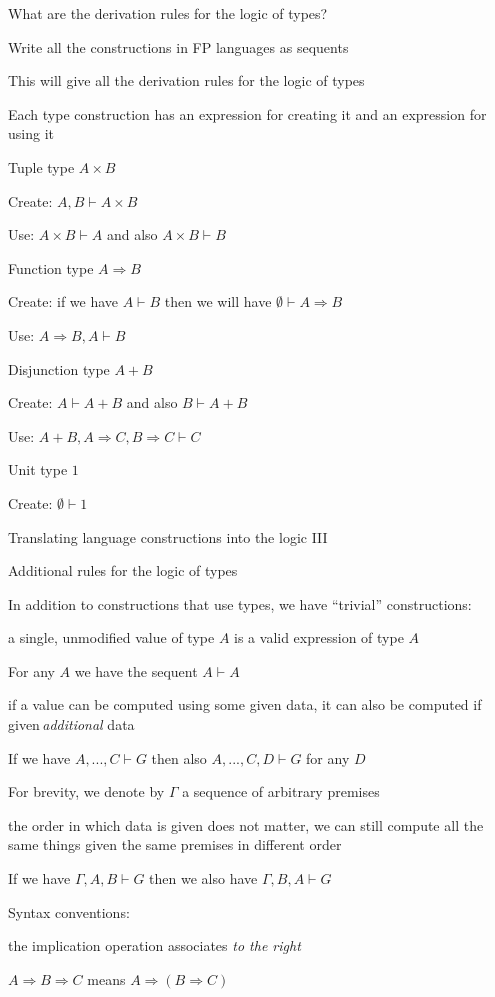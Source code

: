 What are the derivation rules for the logic of types?

Write all the constructions in FP languages as sequents

This will give all the derivation rules for the logic of types

Each type construction has an expression for creating it and an expression
for using it

Tuple type $A\times B$

Create: $A,B\vdash A\times B$ 

Use: $A\times B\vdash A$ and also $A\times B\vdash B$

Function type $A\Rightarrow B$

Create: if we have $A\vdash B$ then we will have $\emptyset\vdash A\Rightarrow B$ 

Use: $A\Rightarrow B,A\vdash B$

Disjunction type $A+B$

Create: $A\vdash A+B$ and also $B\vdash A+B$

Use: $A+B,A\Rightarrow C,B\Rightarrow C\vdash C$

Unit type $1$

Create: $\emptyset\vdash1$

Translating language constructions into the logic III

Additional rules for the logic of types

In addition to constructions that use types, we have ``trivial''
constructions:

a single, unmodified value of type $A$ is a valid expression of type
$A$

For any $A$ we have the sequent $A\vdash A$

if a value can be computed using some given data, it can also be computed
if given\,\emph{additional} data

If we have $A,...,C\vdash G$ then also $A,...,C,D\vdash G$ for any
$D$

For brevity, we denote by $\Gamma$ a sequence of arbitrary premises

the order in which data is given does not matter, we can still compute
all the same things given the same premises in different order

If we have $\Gamma,A,B\vdash G$ then we also have $\Gamma,B,A\vdash G$

Syntax conventions:

the implication operation associates \emph{to the right}

$A\Rightarrow B\Rightarrow C$ means $A\Rightarrow\left(B\Rightarrow C\right)$

